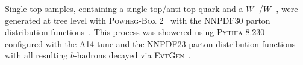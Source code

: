 Single-top samples, containing a single top/anti-top quark and a
$W^{-}$/$W^{+}$, were generated at tree level with \textsc{Powheg-Box}
2~\cite{Campbell2012} with the NNPDF30 parton distribution
functions~\cite{Lai:2010vv}. This process was showered using \textsc{Pythia}
8.230~\cite{Sjostrand:2014zea} configured with the A14 tune and the NNPDF23
parton distribution functions~\cite{Carrazza:2013axa} with all resulting
$b$-hadrons decayed via \textsc{EvtGen}~\cite{LANGE2001152}.

